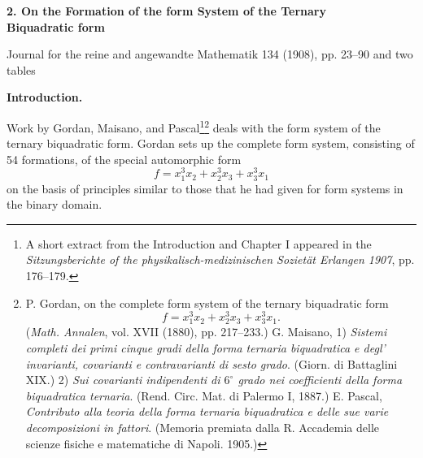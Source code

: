 \documentclass[11pt]{article}
\begin{document}
\providecommand{\Afield}{\mathfrak A}
\providecommand{\Bfield}{\mathfrak B}
\providecommand{\Cfield}{\mathfrak C}
\providecommand{\Sdomain}{\mathfrak S}
\providecommand{\Kfield}{\mathfrak K}
\providecommand{\Rfield}{\mathfrak R}
\providecommand{\Xreal}{\mathfrak X}
\providecommand{\Yreal}{\mathfrak Y}

\begin{center}
{\Large\bfseries 2. On the Formation of the form System of the Ternary\\ Biquadratic form}\par
\vspace{1.5em}
Journal for the reine and angewandte Mathematik 134 (1908), pp. 23--90 and two tables
\end{center}

\vspace{3em}

\begin{center}
\textbf{Introduction.}
\end{center}

Work by Gordan, Maisano, and Pascal\footnote{A short extract from the Introduction and Chapter I appeared in the \emph{Sitzungsberichte of the physikalisch-medizinischen Sozietät Erlangen 1907}, pp. 176--179.}\footnote{P. Gordan, on the complete form system of the ternary biquadratic form
\[
f=x_1^3x_2+x_2^3x_3+x_3^3x_1.
\]
(\emph{Math. Annalen}, vol. XVII (1880), pp. 217--233.)
G. Maisano, 1) \emph{Sistemi completi dei primi cinque gradi della forma ternaria biquadratica e degl' invarianti, covarianti e contravarianti di sesto grado}. (Giorn. di Battaglini XIX.)
2) \emph{Sui covarianti indipendenti di $6^\circ$ grado nei coefficienti della forma biquadratica ternaria}. (Rend. Circ. Mat. di Palermo I, 1887.)
E. Pascal, \emph{Contributo alla teoria della forma ternaria biquadratica e delle sue varie decomposizioni in fattori}. (Memoria premiata dalla R. Accademia delle scienze fisiche e matematiche di Napoli. 1905.)} deals with the form system of the ternary biquadratic form. Gordan sets up the complete form system, consisting of 54 formations, of the special automorphic form
\[
f=x_1^3x_2+x_2^3x_3+x_3^3x_1
\]
on the basis of principles similar to those that he had given for form systems in the binary domain.
\end{document}
